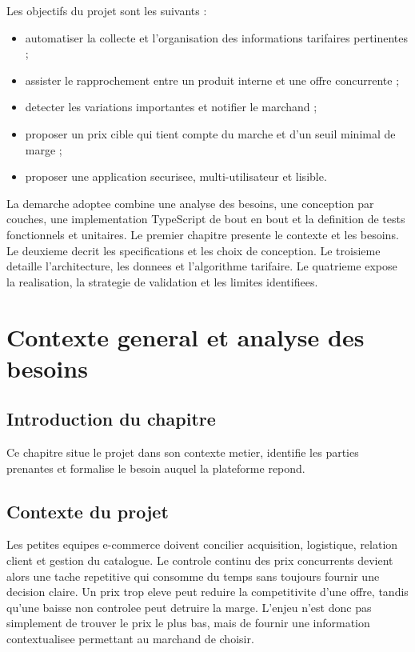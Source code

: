 \documentclass[12pt,a4paper,oneside]{report}
\begin{document}
Les objectifs du projet sont les suivants :
\begin{itemize}
  \item automatiser la collecte et l'organisation des informations tarifaires pertinentes ;
  \item assister le rapprochement entre un produit interne et une offre concurrente ;
  \item detecter les variations importantes et notifier le marchand ;
  \item proposer un prix cible qui tient compte du marche et d'un seuil minimal de marge ;
  \item proposer une application securisee, multi-utilisateur et lisible.
\end{itemize}

La demarche adoptee combine une analyse des besoins, une conception par couches, une implementation TypeScript de bout en bout et la definition de tests fonctionnels et unitaires. Le premier chapitre presente le contexte et les besoins. Le deuxieme decrit les specifications et les choix de conception. Le troisieme detaille l'architecture, les donnees et l'algorithme tarifaire. Le quatrieme expose la realisation, la strategie de validation et les limites identifiees.
\clearpage

\chapter{Contexte general et analyse des besoins}
\section*{Introduction du chapitre}
Ce chapitre situe le projet dans son contexte metier, identifie les parties prenantes et formalise le besoin auquel la plateforme repond.

\section{Contexte du projet}
Les petites equipes e-commerce doivent concilier acquisition, logistique, relation client et gestion du catalogue. Le controle continu des prix concurrents devient alors une tache repetitive qui consomme du temps sans toujours fournir une decision claire. Un prix trop eleve peut reduire la competitivite d'une offre, tandis qu'une baisse non controlee peut detruire la marge. L'enjeu n'est donc pas simplement de trouver le prix le plus bas, mais de fournir une information contextualisee permettant au marchand de choisir.
\end{document}
